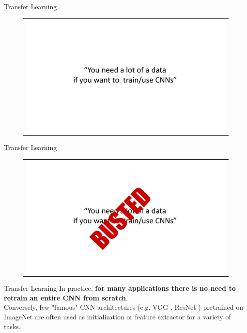 \documentclass[aspectratio=169]{beamer}
\begin{document}
\begin{frame}{Transfer Learning}
\vspace{-1cm}
\begin{figure}
\begin{tabular}{c}
\includegraphics[width=\textwidth]{img/cnn/busted_0.pdf}
\end{tabular}
\end{figure}
\end{frame}

\begin{frame}{Transfer Learning}
\vspace{-1cm}
\begin{figure}
\begin{tabular}{c}
\includegraphics[width=\textwidth]{img/cnn/busted_1.pdf}
\end{tabular}
\end{figure}
\end{frame}


\begin{frame}{Transfer Learning}
In practice, \textbf{for many applications there is no need to retrain an entire CNN from scratch}.\\
\vspace{0.5cm}
Conversely, few "famous" CNN architectures (e.g. VGG \cite{simonyan2014very}, ResNet \cite{he2016deep}) pretrained on ImageNet \cite{deng2009imagenet} are often used as initialization or feature extractor for a variety of tasks.
\end{frame}
\end{document}
